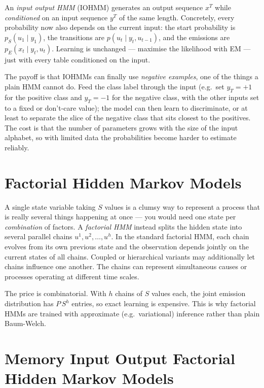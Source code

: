 \documentclass[11pt, oneside]{book}
\begin{document}
An \emph{input output HMM} (IOHMM) generates an output sequence $x^T$ while
\emph{conditioned} on an input sequence $y^T$ of the same length. Concretely,
every probability now also depends on the current input: the start probability
is $p_S(u_1 \mid y_1)$, the transitions are $p(u_t \mid y_t, u_{t-1})$, and the
emissions are $p_E(x_t \mid y_t, u_t)$. Learning is unchanged — maximise the
likelihood with EM — just with every table conditioned on the input.

The payoff is that IOHMMs can finally use \emph{negative examples}, one of the
things a plain HMM cannot do. Feed the class label through the input (e.g.\ set
$y_T = +1$ for the positive class and $y_T = -1$ for the negative class, with the
other inputs set to a fixed or don't-care value); the model can then learn to
discriminate, or at least to separate the slice of the negative class that sits
closest to the positives. The cost is that the number of parameters grows with
the size of the input alphabet, so with limited data the probabilities become
harder to estimate reliably.

\section{Factorial Hidden Markov Models}

A single state variable taking $S$ values is a clumsy way to represent a process
that is really several things happening at once — you would need one state per
\emph{combination} of factors. A \emph{factorial HMM} instead splits the hidden
state into several parallel chains $u^1, u^2, \ldots, u^h$. In the standard factorial
HMM, each chain evolves from its own previous state and the observation depends jointly
on the current states of all chains. Coupled or hierarchical variants may additionally
let chains influence one another. The chains can represent simultaneous causes or
processes operating at different time scales.

The price is combinatorial. With $h$ chains of $S$ values each, the joint
emission distribution has $P\,S^{h}$ entries, so exact learning is expensive.
This is why factorial HMMs are trained with approximate (e.g.\ variational)
inference rather than plain Baum-Welch.

\section{Memory Input Output Factorial Hidden Markov Models}
\label{sec:miofhmm}
\end{document}
